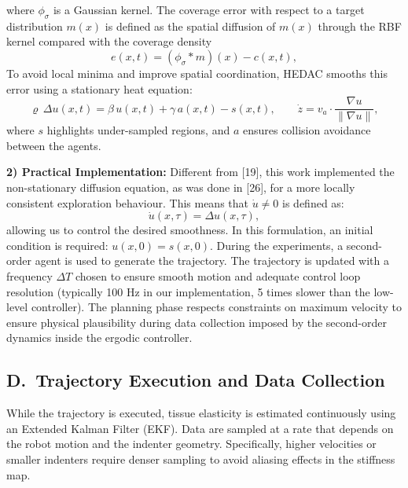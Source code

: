 \documentclass[11pt]{article}
\begin{document}
where $\phi_{\sigma}$ is a Gaussian kernel. The coverage error with
respect to a target distribution $m(x)$ is defined as the spatial
diffusion of $m(x)$ through the RBF kernel compared with the coverage
density
\begin{equation}
e(x, t) = (\phi_{\sigma} * m)(x) - c(x, t),
\end{equation}
To avoid local minima and improve spatial coordination, HEDAC
smooths this error using a stationary heat equation:
\[
\varrho\, \Delta u(x, t) = \beta\, u(x, t) + \gamma\, a(x, t) - s(x, t),
\qquad
\dot{z} = v_{a} \cdot \frac{\nabla u}{\|\nabla u\|},
\]
where $s$ highlights under-sampled regions, and $a$ ensures
collision avoidance between the agents.

\textbf{2) Practical Implementation:} Different from [19], this work
implemented the non-stationary diffusion equation, as was done in
[26], for a more locally consistent exploration behaviour. This means
that $\dot{u} \ne 0$ is defined as:
\begin{equation}
\dot{u}(x, \tau) = \Delta u(x, \tau),
\end{equation}
allowing us to control the desired smoothness. In this formulation,
an initial condition is required: $u(x, 0) = s(x, 0)$. During the
experiments, a second-order agent is used to generate the trajectory.
The trajectory is updated with a frequency $\Delta T$ chosen to
ensure smooth motion and adequate control loop resolution (typically
100 Hz in our implementation, 5 times slower than the low-level
controller). The planning phase respects constraints on maximum
velocity to ensure physical plausibility during data collection
imposed by the second-order dynamics inside the ergodic controller.

\subsection*{D.\ Trajectory Execution and Data Collection}

While the trajectory is executed, tissue elasticity is estimated
continuously using an Extended Kalman Filter (EKF). Data are sampled
at a rate that depends on the robot motion and the indenter geometry.
Specifically, higher velocities or smaller indenters require denser
sampling to avoid aliasing effects in the stiffness map.
\end{document}
